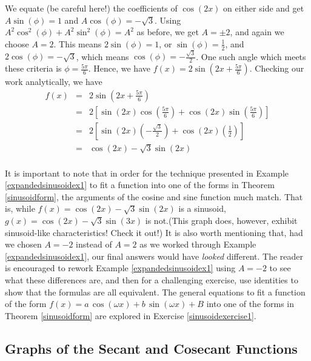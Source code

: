 {\begin{enumerate}
We equate (be careful here!) the coefficients of $\cos(2x)$ on either side and get $A\sin(\phi) = 1$ and $A\cos(\phi) = -\sqrt{3}$.  Using $A^2\cos^{2}(\phi) + A^2\sin^{2}(\phi) = A^2$ as before, we get $A = \pm 2$, and again we choose $A = 2$.  This means $2 \sin(\phi) = 1$, or $\sin(\phi) = \frac{1}{2}$,  and $2\cos(\phi) = -\sqrt{3}$, which means $\cos(\phi) = -\frac{\sqrt{3}}{2}$.  One such angle which meets these criteria   is $\phi = \frac{5\pi}{6}$.  Hence, we have $f(x) = 2 \sin\left(2x + \frac{5\pi}{6}\right)$.  Checking our work analytically, we have \[\begin{array}{rcl} f(x) &  = &  2 \sin\left(2x + \frac{5\pi}{6}\right) \\ [3pt] & = &  2 \left[ \sin(2x) \cos\left(\frac{5\pi}{6}\right) + \cos(2x) \sin\left(\frac{5\pi}{6}\right) \right]\\ [3pt] & = & 2 \left[ \sin(2x) \left(-\frac{\sqrt{3}}{2}\right) +  \cos(2x) \left(\frac{1}{2}\right)\right] \\ [3pt] & = & \cos(2x) - \sqrt{3} \sin(2x) \\ \end{array}\]
\end{enumerate}
}

\medskip

It is important to note that in order for the technique presented in Example \ref{expandedsinusoidex1} to fit a function into one of the forms in Theorem \ref{sinusoidform},  the arguments of the cosine and sine function much match.  That is, while $f(x) = \cos(2x) - \sqrt{3} \sin(2x)$ is a sinusoid, $g(x) =  \cos(2x) - \sqrt{3} \sin(3x)$ is not.(This graph does, however, exhibit sinusoid-like characteristics!  Check it out!)  It is also worth mentioning that, had we chosen  $A = -2$ instead of $A = 2$ as we worked through Example \ref{expandedsinusoidex1}, our final answers would have \textit{looked} different. The reader is encouraged to rework Example  \ref{expandedsinusoidex1} using $A = -2$ to see what these differences are, and then for a challenging exercise, use identities to show that the formulas are all equivalent.  The general equations to fit a function of the form $f(x) = a \, \cos(\omega x) + b \, \sin(\omega x) + B$ into one of the forms in Theorem \ref{sinusoidform} are explored in Exercise \ref{sinusoidexercise1}.

\subsection{Graphs of the Secant and Cosecant Functions}
\label{secantcosecantgraphsection}

